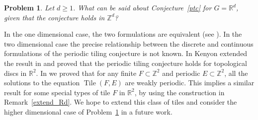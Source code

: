 \documentclass[reqno,a4paper,12pt]{amsart}
\numberwithin{equation}{section}
\numberwithin{figure}{section}
\def\R{\mathbb{R}}
\def\Z{\mathbb{Z}}
\renewcommand\geq{\geqslant}
\newcommand{\Tile}{\operatorname{Tile}}
\theoremstyle{plain}
\newtheorem{problem}[thm]{Problem}
\theoremstyle{definition}
\newcommand{\probref}[1]{Problem~\ref{#1}}
\newcommand{\conjref}[1]{Conjecture~\ref{#1}}
\newcommand{\remref}[1]{Remark~\ref{#1}}
\begin{document}
\begin{problem}\label{problem_Rd}
Let $d\geq 1$. What can be said about  \conjref{ptc} for $G=\R^d$, given that the conjecture holds in $\Z^d$?
\end{problem}
In the one dimensional case, the two formulations are equivalent (see \cite{LW}). In the two dimensional case the precise relationship between the discrete and continuous formulations of the periodic tiling conjecture is not known. In \cite{ken,err}  Kenyon extended the result in \cite{gbn} and proved that the periodic tiling conjecture holds for topological discs in $\R^2$. 
In \cite{GT} we  proved that for any finite $F\subset \Z^2$ and periodic $E\subset \Z^2$, all the solutions to the equation $\Tile(F,E)$ are weakly periodic. This  implies a similar result for some special types of tile $F$ in  $\R^2$, by using the construction in \remref{extend_Rd}.  We hope to extend this class of tiles and consider the higher dimensional case of \probref{problem_Rd} in a future work. 
\end{document}
